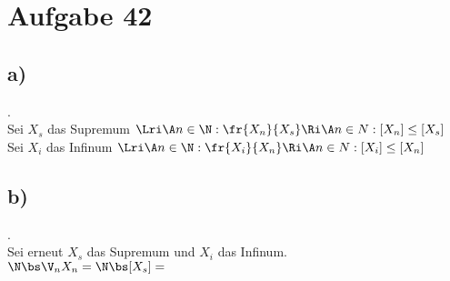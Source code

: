 
\section*{Aufgabe 42}
\subsection*{a)}.\\
Sei $X_s$ das Supremum $\Lri \A n \in \N: \fr{X_n}{X_s} \Ri \A n \in N: [X_n] \leq [X_s]$ \\
Sei $X_i$ das Infinum $\Lri \A n \in \N: \fr{X_i}{X_n} \Ri \A n \in N: [X_i] \leq [X_n]$ \\
\subsection*{b)}.\\
Sei erneut $X_s$ das Supremum und $X_i$ das Infinum. \\
$\N \bs \V_nX_n = \N \bs [X_s] = $ %
